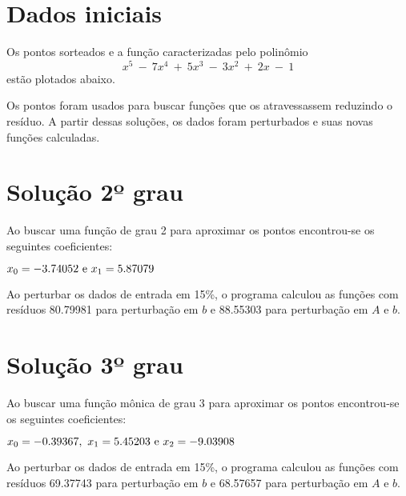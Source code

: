 \section{Dados iniciais}
Os pontos sorteados e a função caracterizadas pelo polinômio \[x^5~-~7x^4~+~5x^3~-~3x^2~+~2x~-~1\]
estão plotados abaixo.


Os pontos foram usados para buscar funções que os atravessassem reduzindo o resíduo.
A partir dessas soluções, os dados foram perturbados e suas novas funções calculadas.



\newpage
\section{Solução 2º grau}

Ao buscar uma função de grau 2 para aproximar os pontos encontrou-se os seguintes 
coeficientes:

\(x_0 = -3.74052 ~$e$~  x_1 = 5.87079 \)


Ao perturbar os dados de entrada em 15\%, o programa calculou as funções 
com resíduos 80.79981 para perturbação em $b$ e 88.55303 para perturbação em $A$ e $b$.
%


\newpage
\section{Solução 3º grau}

Ao buscar uma função mônica de grau 3 para aproximar os pontos encontrou-se os seguintes 
coeficientes:

\(x_0 = -0.39367  ,~  x_1 = 5.45203  ~$e$~ x_2 = -9.03908 \)


Ao perturbar os dados de entrada em 15\%, o programa calculou as funções 
com resíduos 69.37743  para perturbação em $b$ e 68.57657 para perturbação em $A$ e $b$.

